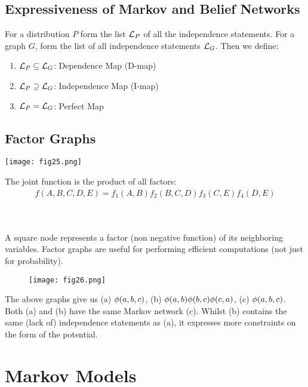 \subsection{Expressiveness of Markov and Belief Networks}

For a distribution $P$ form the list $\mathcal{L}_P$ of all the independence statements. For a graph $G$, form the list of all independence statements $\mathcal{L}_G$. Then we define:
\begin{enumerate}
	\item $\mathcal{L}_P\subseteq\mathcal{L}_G$: Dependence Map (D-map)
	\item $\mathcal{L}_P\supseteq\mathcal{L}_G$: Independence Map (I-map)
	\item $\mathcal{L}_P=\mathcal{L}_G$: Perfect Map
\end{enumerate}

\subsection{Factor Graphs}

\begin{minipage}{0.4\textwidth}
	\centering
	\texttt{[image: fig25.png]}
\end{minipage}
\begin{minipage}{0.6\textwidth}
	The joint function is the product of all factors:
	\begin{align*}
	f(A,B,C,D,E)=f_1(A,B)f_2(B,C,D)f_3(C,E)f_4(D,E)
	\end{align*}
\end{minipage}
\\ \\
A square node represents a factor (non negative function) of its neighboring variables. Factor graphs are useful for performing efficient computations (not just for probability).
\begin{figure*}[h]
	\centering
	\texttt{[image: fig26.png]}
\end{figure*}

The above graphs give us (a) $\phi(a,b,c)$, (b) $\phi(a,b)\phi(b,c)\phi(c,a)$, (c) $\phi(a,b,c)$. Both (a) and (b) have the same Markov network (c). Whilst (b) contains the same (lack of) independence statements as (a), it expresses more constraints on the form of the potential.



\section{Markov Models}
\label{section11.4}

